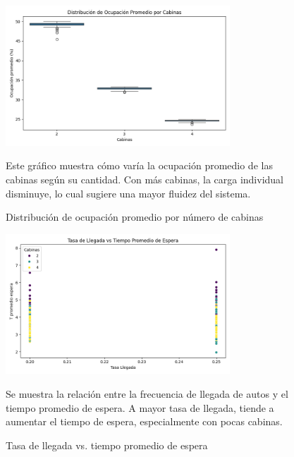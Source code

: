 \documentclass[12pt]{article}
\begin{document}
    \begin{figure}[H]
    \centering
    \includegraphics[width=0.75\textwidth]{boxplot_ocupacion.png}
    \caption{Distribución de ocupación promedio por número de cabinas}
    \small Este gráfico muestra cómo varía la ocupación promedio de las cabinas según su cantidad. Con más cabinas, la carga individual disminuye, lo cual sugiere una mayor fluidez del sistema.
    \end{figure}
    
    \begin{figure}[H]
    \centering
    \includegraphics[width=0.75\textwidth]{scatter_llegada_espera.png}
    \caption{Tasa de llegada vs. tiempo promedio de espera}
    \small Se muestra la relación entre la frecuencia de llegada de autos y el tiempo promedio de espera. A mayor tasa de llegada, tiende a aumentar el tiempo de espera, especialmente con pocas cabinas.
    \end{figure}
    
\end{document}
